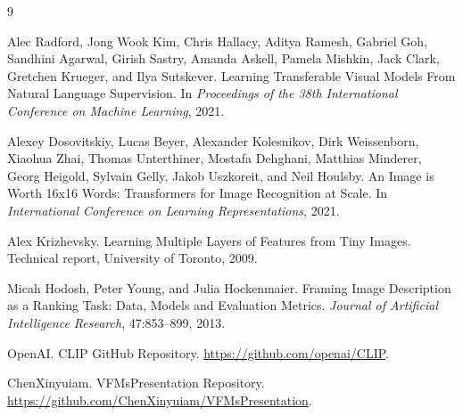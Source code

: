 \documentclass[UTF8,zihao=-4]{ctexart}
\begin{document}
\begin{thebibliography}{9}

Alec Radford, Jong Wook Kim, Chris Hallacy, Aditya Ramesh, Gabriel Goh, Sandhini Agarwal, Girish Sastry, Amanda Askell, Pamela Mishkin, Jack Clark, Gretchen Krueger, and Ilya Sutskever.
\newblock Learning Transferable Visual Models From Natural Language Supervision.
\newblock In \emph{Proceedings of the 38th International Conference on Machine Learning}, 2021.

Alexey Dosovitskiy, Lucas Beyer, Alexander Kolesnikov, Dirk Weissenborn, Xiaohua Zhai, Thomas Unterthiner, Mostafa Dehghani, Matthias Minderer, Georg Heigold, Sylvain Gelly, Jakob Uszkoreit, and Neil Houlsby.
\newblock An Image is Worth 16x16 Words: Transformers for Image Recognition at Scale.
\newblock In \emph{International Conference on Learning Representations}, 2021.

Alex Krizhevsky.
\newblock Learning Multiple Layers of Features from Tiny Images.
\newblock Technical report, University of Toronto, 2009.

Micah Hodosh, Peter Young, and Julia Hockenmaier.
\newblock Framing Image Description as a Ranking Task: Data, Models and Evaluation Metrics.
\newblock \emph{Journal of Artificial Intelligence Research}, 47:853--899, 2013.

OpenAI.
\newblock CLIP GitHub Repository.
\newblock \url{https://github.com/openai/CLIP}.

ChenXinyuiam.
\newblock VFMsPresentation Repository.
\newblock \url{https://github.com/ChenXinyuiam/VFMsPresentation}.

\end{thebibliography}
\end{document}
